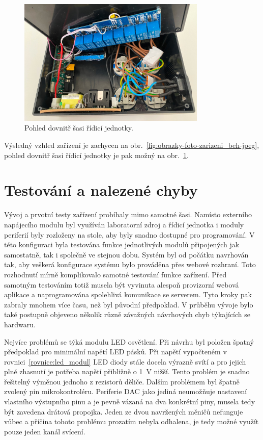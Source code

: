 \begin{figure}[h!]
    \centering
    \includegraphics[width=0.8\textwidth]{obrazky/foto/ulozeni.jpeg}
    \caption{Pohled dovnitř šasi řídicí jednotky.}
    \label{fig:obrazky-foto-ulozeni-jpeg}
\end{figure}


Výsledný vzhled zařízení je zachycen na obr.~\ref{fig:obrazky-foto-zarizeni_beh-jpeg}, pohled dovnitř šasi řídicí jednotky je pak možný na obr.~\ref{fig:obrazky-foto-ulozeni-jpeg}.

\section{Testování a nalezené chyby}
    Vývoj a prvotní testy zařízení probíhaly mimo samotné šasi. Namísto externího napájecího modulu byl využíván laboratorní zdroj a řídicí jednotka i moduly periferií byly rozloženy na stole, aby byly snadno dostupné pro programování. V této konfiguraci byla testována funkce jednotlivých modulů připojených jak samostatně, tak i společně ve stejnou dobu. Systém byl od počátku navrhován tak, aby veškerá konfigurace systému bylo prováděna přes webové rozhraní. Toto rozhodnutí mírně komplikovalo samotné testování funkce zařízení. Před samotným testováním totiž musela být vyvinuta alespoň provizorní webová aplikace a naprogramována spolehlivá komunikace se serverem. Tyto kroky pak zabraly mnohem více času, než byl původní předpoklad. V průběhu vývoje bylo také postupně objeveno několik různě závažných návrhových chyb týkajících se hardwaru. 
    
    Nejvíce problémů se týká modulu LED osvětlení. Při návrhu byl položen špatný předpoklad pro minimální napětí LED pásků. Při napětí vypočteném v rovnici~\ref{rovnice:led_modul} LED diody stále docela výrazně svítí a pro jejich plné zhasnutí je potřeba napětí přibližně o \qty{1}{V} nižší. Tento problém je snadno řešitelný výměnou jednoho z rezistorů děliče. Dalším problémem byl špatně zvolený pin mikrokontroléru. Periferie DAC jako jediná neumožňuje nastavení vlastního výstupního pinu a je pevně vázaná na dva konkrétní piny, musela tedy být zavedena drátová propojka. Jeden ze dvou navržených měničů nefunguje vůbec a příčina tohoto problému prozatím nebyla odhalena, je tedy možné využít pouze jeden kanál svícení. 

